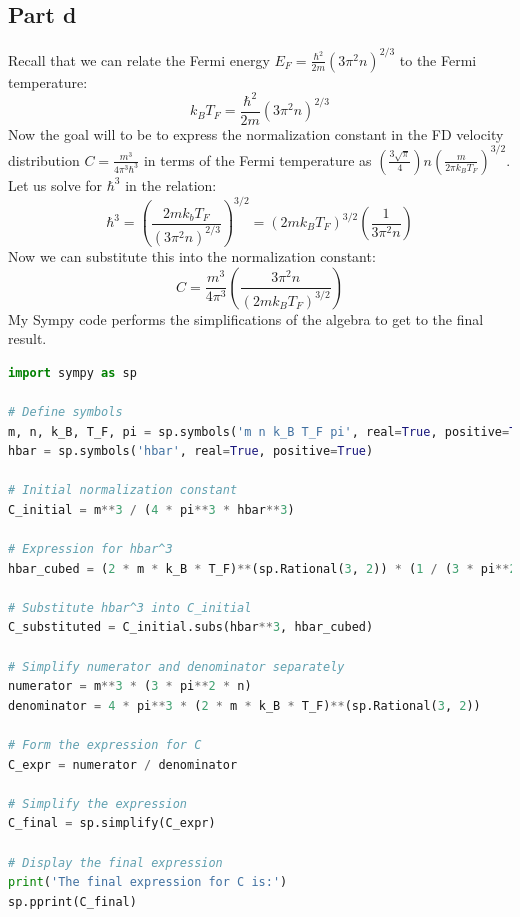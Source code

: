 \documentclass[12pt]{article}
\begin{document}
\subsection{Part d}
Recall that we can relate the Fermi energy $E_F = \frac{\hbar^2}{2m}(3\pi^2n)^{2/3}$ to the Fermi temperature:
\begin{equation}
    k_B T_F = \frac{\hbar^2}{2m}(3\pi^2n)^{2/3}
\end{equation}
Now the goal will to be to express the normalization constant in the FD velocity distribution $C=\frac{m^3}{4\pi^3\hbar^3}$ in terms of the Fermi temperature as $\left(\frac{3\sqrt{\pi}}{4}\right)n\left(\frac{m}{2\pi k_B T_F}\right)^{3/2}$. Let us solve for $\hbar^3$ in the relation:
\begin{equation}
    \hbar^3 = \left(\frac{2 m k_b T_F }{\left(3\pi^2 n\right)^{2/3}}\right)^{3/2} = \left(2 m k_B T_F\right)^{3/2} \left(\frac{1}{3\pi^2 n}\right)
\end{equation}
Now we can substitute this into the normalization constant:
\begin{equation}
    C = \frac{m^3}{4\pi^3} \left(\frac{3\pi^2 n}{\left(2 m k_B T_F\right)^{3/2}}\right)
\end{equation}
My Sympy code performs the simplifications of the algebra to get to the final result.
\begin{lstlisting}[language=Python]
import sympy as sp

# Define symbols
m, n, k_B, T_F, pi = sp.symbols('m n k_B T_F pi', real=True, positive=True)
hbar = sp.symbols('hbar', real=True, positive=True)

# Initial normalization constant
C_initial = m**3 / (4 * pi**3 * hbar**3)

# Expression for hbar^3
hbar_cubed = (2 * m * k_B * T_F)**(sp.Rational(3, 2)) * (1 / (3 * pi**2 * n))

# Substitute hbar^3 into C_initial
C_substituted = C_initial.subs(hbar**3, hbar_cubed)

# Simplify numerator and denominator separately
numerator = m**3 * (3 * pi**2 * n)
denominator = 4 * pi**3 * (2 * m * k_B * T_F)**(sp.Rational(3, 2))

# Form the expression for C
C_expr = numerator / denominator

# Simplify the expression
C_final = sp.simplify(C_expr)

# Display the final expression
print('The final expression for C is:')
sp.pprint(C_final)

\end{lstlisting}
\end{document}

